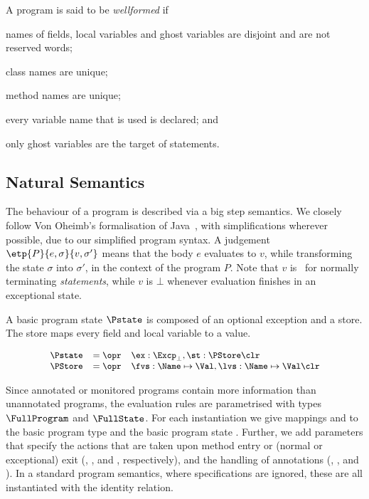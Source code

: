 A program is said to be \emph{wellformed} if
\begin{inparaenum}
\item names of fields, local variables and ghost variables are
disjoint and are not reserved words;
\item class names are unique;
\item method names are unique;
\item every variable name that is used is declared; and
\item only ghost variables are the target of \Set statements.
\end{inparaenum}


\subsection{Natural Semantics}\label{SecSemantics}
The behaviour of a program is described via a big step semantics. We
closely follow Von Oheimb's formalisation of Java~\cite{Oheimb01},
with simplifications wherever possible, due to our simplified
program syntax. A judgement $\etp{P}{e,\sigma}{v,\sigma'}$ means that the body
$e$ evaluates to $v$, while transforming the state $\sigma$ into $\sigma'$, in
the context of the program \(P\). Note that \(v\) is \One\ for
normally terminating \emph{statements}, while \(v\) is \(\bot\) whenever
evaluation finishes in an exceptional state.

A basic program state \(\Pstate\) is composed of an optional exception
and a store.  The store maps every field and local variable to a
value.

\[
{\small
\begin{array}{rcl}
\Pstate & = \opr & \ex : \Excp_{\bot}, \st : \PStore \clr\\
\PStore & = \opr & \fvs : \Name \mapsto \Val, \lvs : \Name \mapsto \Val \clr
\end{array}}
\]

Since annotated or monitored programs
contain more information than unannotated programs, the
evaluation rules are parametrised with types
\(\FullProgram\) and \(\FullState\). For each instantiation we give
mappings \program and \progstate to the basic program type \Program
and the basic program state \Pstate. Further, we add parameters that
specify the actions that are taken upon method entry or (normal or
exceptional) exit (\gammain, \gammanorm, and \gammaexc, respectively),
and the handling of annotations (\deltaset, \deltaassert, and
\deltacase).  In a standard program semantics, where specifications
are ignored, these are all instantiated with the identity relation.

